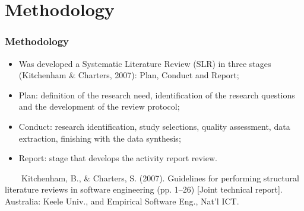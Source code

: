 \documentclass[10pt]{beamer}
\begin{document}
\section{Methodology}

\begin{frame}
	\frametitle{Methodology}
	\begin{itemize}
		\item Was developed a Systematic Literature Review (SLR) in three stages \footnotesize(Kitchenham \& Charters, 2007)\normalsize: Plan, Conduct and Report;
		\item Plan: definition of the research need, identification of the research questions and the development of the review protocol;
		\item Conduct: research identification, study selections, quality assessment, data extraction, finishing with the data synthesis;
		\item Report: stage that develops the activity report review.
	\end{itemize}
	\tiny 
	~~~~Kitchenham, B., \& Charters, S. (2007). Guidelines for performing structural literature reviews in software engineering (pp. 1–26) [Joint technical report]. Australia: Keele Univ., and Empirical Software Eng., Nat’l ICT.\\
\end{frame}

\end{document}
